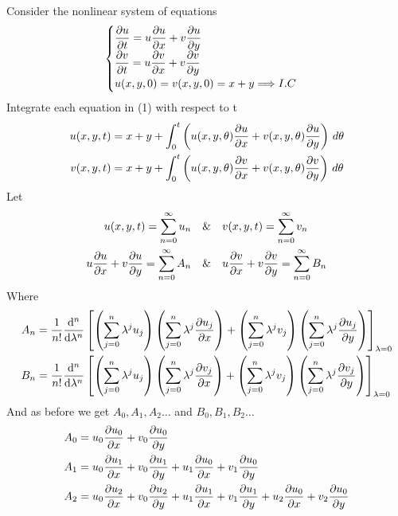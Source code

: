 \setcounter{equation}{0}
\begin{example}
    Consider the nonlinear system of equations
    \begin{equation}
        \begin{cases}
            \displaystyle \pdv{u}{t}= u\pdv{u}{x} + v\pdv{u}{y}
            \\
            \displaystyle \pdv{v}{t}= u\pdv{v}{x} + v\pdv{v}{y}
            \\
            \displaystyle u(x,y,0)=v(x,y,0)=x+y \Longrightarrow I.C
        \end{cases}
    \end{equation}
    Integrate each equation in (1) with respect to t
    \begin{align*}
        u(x,y,t) & =x+y + \int_0^{t}\left( u(x,y,\theta)\pdv{u}{x} + v(x,y,\theta)\pdv{u}{y} \right)\, d\theta
        \\
        v(x,y,t) & =x+y + \int_0^{t}\left(u(x,y,\theta)\pdv{v}{x} + v(x,y,\theta)\pdv{v}{y} \right) \, d\theta
    \end{align*}
    Let
    \begin{align*}
        u(x,y,t) = \sum_{n=0}^{\infty} u_n \quad             & \&\quad v(x,y,t) = \sum_{n=0}^\infty v_n
        \\
        u\pdv{u}{x}+v\pdv{u}{y} =\sum_{n=0}^\infty A_n \quad & \&\quad u\pdv{v}{x}+v\pdv{v}{y} =\sum_{n=0}^\infty B_n
    \end{align*}
    Where
    \begin{align*}
        A_n & = \frac{1}{n!} \dv[n]{}{\lambda}\left[\left(\sum_{j=0}^{n} \lambda^j u_j\right)\left(\sum_{j=0}^{n} \lambda^j \pdv{u_j}{x}\right)+ \left(\sum_{j=0}^{n} \lambda^j v_j\right)\left(\sum_{j=0}^{n} \lambda^j \pdv{u_j}{y}\right)\right]_{\lambda=0}
        \\
        B_n & = \frac{1}{n!} \dv[n]{}{\lambda}\left[\left(\sum_{j=0}^{n} \lambda^j u_j\right)\left(\sum_{j=0}^{n} \lambda^j \pdv{v_j}{x}\right)+ \left(\sum_{j=0}^{n} \lambda^j v_j\right)\left(\sum_{j=0}^{n} \lambda^j \pdv{v_j}{y}\right)\right]_{\lambda=0}
    \end{align*}
    And as before we get $A_0,A_1,A_2\dots$ and $B_0,B_1,B_2\dots$
    \begin{align*}
        A_0 & = u_0 \pdv{u_0}{x}+v_0 \pdv{u_0}{y}
        \\
        A_1 & = u_0 \pdv{u_1}{x} + v_0 \pdv{u_1}{y} + u_1 \pdv{u_0}{x} + v_1 \pdv{u_0}{y}
        \\
        A_2 & = u_0 \pdv{u_2}{x} + v_0 \pdv{u_2}{y} + u_1 \pdv{u_1}{x} + v_1 \pdv{u_1}{y} + u_2 \pdv{u_0}{x} + v_2 \pdv{u_0}{y}

\end{align*}
\end{example}
